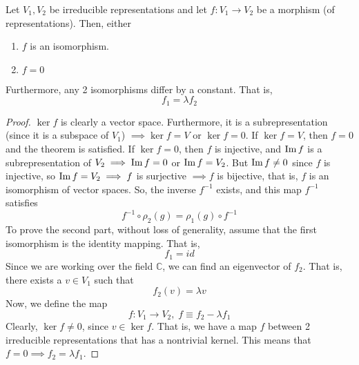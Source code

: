   \begin{lemma}
    Let $V_1, V_2$ be irreducible representations and let $f: V_1 \longrightarrow V_2$ be a morphism (of representations). Then, either
    \begin{enumerate}
      \item $f$ is an isomorphism. 
      \item $f = 0$
    \end{enumerate}
    Furthermore, any 2 isomorphisms differ by a constant. That is, 
    \begin{equation}
      f_1 = \lambda f_2
    \end{equation}
  \end{lemma}
  \begin{proof}
    $\ker{f}$ is clearly a vector space. Furthermore, it is a subrepresentation (since it is a subspace of $V_1$) $\implies \ker{f} = V$ or $\ker{f} = 0$. If $\ker{f} = V$, then $f = 0$ and the theorem is satisfied. If $\ker{f} = 0$, then $f$ is injective, and $\operatorname{Im}{f}$ is a subrepresentation of $V_2 \implies \operatorname{Im}{f} = 0$ or $\operatorname{Im}{f} = V_2$. But $\operatorname{Im}{f} \neq 0$ since $f$ is injective, so $\operatorname{Im}{f} = V_2 \implies f$ is surjective $\implies f$ is bijective, that is, $f$ is an isomorphism of vector spaces. So, the inverse $f^{-1}$ exists, and this map $f^{-1}$ satisfies
    \begin{equation}
      f^{-1} \circ \rho_2(g) = \rho_1 (g) \circ f^{-1}
    \end{equation}
    To prove the second part, without loss of generality, assume that the first isomorphism is the identity mapping. That is, 
    \begin{equation}
      f_1 = id
    \end{equation}
    Since we are working over the field $\mathbb{C}$, we can find an eigenvector of $f_2$. That is, there exists a $v \in V_1$ such that 
    \begin{equation}
      f_2 (v) = \lambda v
    \end{equation}
    Now, we define the map
    \begin{equation}
      f: V_1 \longrightarrow V_2, \; f \equiv f_2 - \lambda f_1
    \end{equation}
    Clearly, $\ker{f} \neq 0$, since $v \in \ker{f}$. That is, we have a map $f$ between 2 irreducible representations that has a nontrivial kernel. This means that $f = 0 \implies f_2 = \lambda f_1$.  
  \end{proof}


